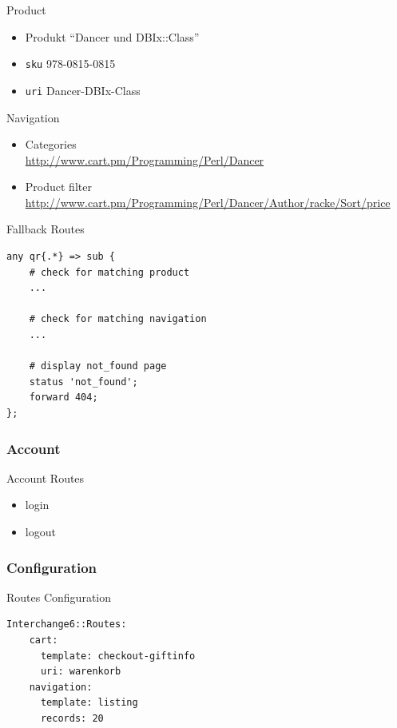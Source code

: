 \begin{frame}[fragile]{Product}
\begin{itemize}
\item Produkt ``Dancer und DBIx::Class''\\
\item \verb|sku| 978-0815-0815 \\
\item \verb|uri| Dancer-DBIx-Class
\end{itemize}
\end{frame}

\begin{frame}{Navigation}
\begin{itemize}
\item Categories \\
\url{http://www.cart.pm/Programming/Perl/Dancer}
\item Product filter \\
\url{http://www.cart.pm/Programming/Perl/Dancer/Author/racke/Sort/price}
\end{itemize}
\end{frame}

\begin{frame}[fragile]{Fallback Routes}
\begin{lstlisting}
any qr{.*} => sub {
    # check for matching product
    ...

    # check for matching navigation
    ...

    # display not_found page
    status 'not_found';
    forward 404;
};
\end{lstlisting}
\end{frame}

\subsubsection{Account}
\begin{frame}[fragile]{Account Routes}
\begin{itemize}
\item login
\item logout
\end{itemize}
\end{frame}

\subsubsection{Configuration}
\begin{frame}[fragile]{Routes Configuration}
\begin{lstlisting}
Interchange6::Routes:
    cart:
      template: checkout-giftinfo
      uri: warenkorb
    navigation:
      template: listing
      records: 20
\end{lstlisting}
\end{frame}

